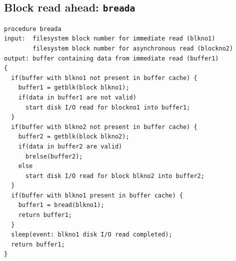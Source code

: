 \subsection*{Block read ahead: \texttt{breada}}
\begin{verbatim}
procedure breada
input:  filesystem block number for immediate read (blkno1)
        filesystem block number for asynchronous read (blockno2)
output: buffer containing data from immediate read (buffer1)
{
  if(buffer with blkno1 not present in buffer cache) {
    buffer1 = getblk(block blkno1);
    if(data in buffer1 are not valid)
      start disk I/O read for blockno1 into buffer1;
  }
  if(buffer with blkno2 not present in buffer cache) {
    buffer2 = getblk(block blkno2);
    if(data in buffer2 are valid)
      brelse(buffer2);
    else
      start disk I/O read for block blkno2 into buffer2;
  }
  if(buffer with blkno1 present in buffer cache) {
    buffer1 = bread(blkno1);
    return buffer1;
  }
  sleep(event: blkno1 disk I/O read completed);
  return buffer1;
}
\end{verbatim}